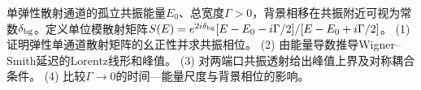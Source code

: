 单弹性散射通道的孤立共振能量\(E_0\)、总宽度\(\Gamma>0\)，背景相移在共振附近可视为常数\(\delta_{\rm bg}\)。定义单位模散射矩阵\(S(E)=e^{2i\delta_{\rm bg}}[E-E_0-i\Gamma/2]/[E-E_0+i\Gamma/2]\)。
(1) 证明弹性单通道散射矩阵的幺正性并求共振相位。
(2) 由能量导数推导Wigner–Smith延迟的Lorentz线形和峰值。
(3) 对两端口共振透射给出峰值上界及对称耦合条件。
(4) 比较\(\Gamma\to0\)的时间—能量尺度与背景相位的影响。
